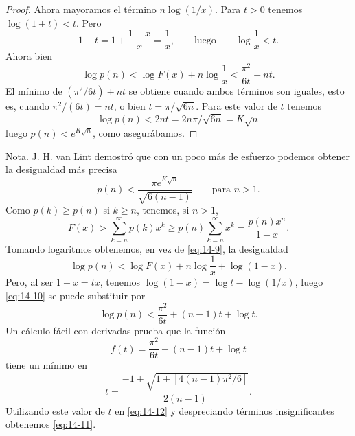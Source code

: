 \begin{proof}
        Ahora mayoramos el término $n\log(1/x)$. Para $t>0$ tenemos $\log(1+t)<t$. Pero
        \begin{equation*}
            1+t=1+\frac{1-x}{x}=\frac{1}{x},\qquad\text{luego}\qquad\log\frac{1}{x}<t.
        \end{equation*}
        Ahora bien
        \begin{equation}\label{eq:14-10}
            \log p(n)<\log F(x)+n\log\frac{1}{x}<\frac{\pi^2}{6t}+nt.
        \end{equation}
        El mínimo de $(\pi^2/6t)+nt$ se obtiene cuando ambos términos son iguales, esto es,
        cuando $\pi^2/(6t)=nt$, o bien $t=\pi/\sqrt{6n}$. Para este valor de $t$ tenemos
        \begin{equation*}
            \log p(n)<2nt=2n\pi/\sqrt{6n}=K\sqrt{n}
        \end{equation*}
        luego $p(n)<e^{K\sqrt{n}}$, como asegurábamos.
    \end{proof}

    Nota. J. H. van Lint \cite{vanlint1974} demostró que con un poco más de esfuerzo podemos
    obtener la desigualdad más precisa
    \begin{equation}\label{eq:14-11}
        p(n)<\frac{\pi e^{K\sqrt{n}}}{\sqrt{6(n-1)}}\qquad\text{para }n>1.
    \end{equation}
    Como $p(k)\geq p(n)$ si $k\geq n$, tenemos, si $n>1$,
    \begin{equation*}
        F(x)>\sum_{k=n}^{\infty}p(k)x^k\geq p(n)\sum_{k=n}^{\infty}x^k=\frac{p(n)x^n}{1-x}.
    \end{equation*}
    Tomando logaritmos obtenemos, en vez de \eqref{eq:14-9}, la desigualdad
    \begin{equation*}
        \log p(n)<\log F(x)+n\log\frac{1}{x}+\log(1-x).
    \end{equation*}
    Pero, al ser $1-x=tx$, tenemos $\log(1-x)=\log t-\log(1/x)$, luego \eqref{eq:14-10} se puede
    substituir por
    \begin{equation}\label{eq:14-12}
        \log p(n)<\frac{\pi^2}{6t}+(n-1)t+\log t.
    \end{equation}
    Un cálculo fácil con derivadas prueba que la función
    \begin{equation*}
        f(t)=\frac{\pi^2}{6t}+(n-1)t+\log t
    \end{equation*}
    tiene un mínimo en
    \begin{equation*}
        t=\frac{-1+\sqrt{1+[4(n-1)\pi^2/6]}}{2(n-1)}.
    \end{equation*}
    Utilizando este valor de $t$ en \eqref{eq:14-12} y despreciando términos insignificantes
    obtenemos \eqref{eq:14-11}.

